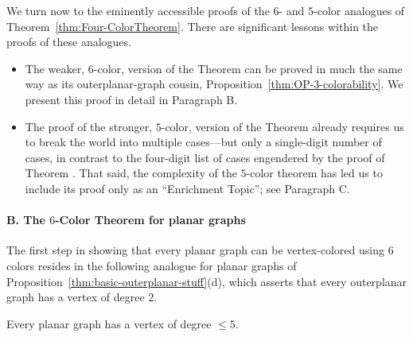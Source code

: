\bigskip

We turn now to the eminently accessible proofs of the $6$- and $5$-color analogues of Theorem~\ref{thm:Four-ColorTheorem}.  There are significant lessons within the proofs of these 
analogues.
\begin{itemize}
\item
The weaker, $6$-color, version of the Theorem can be proved in much the same way as its
outerplanar-graph cousin, Proposition~\ref{thm:OP-3-colorability}.  We
present this proof in detail in Paragraph B.  
\item
The proof of the stronger, $5$-color, version of the Theorem already requires us to break the world into multiple cases---but only a single-digit number of cases, in contrast to the four-digit list of cases engendered by the proof of Theorem \cite{AppelH77a,AppelH77b}.  That said, the complexity of the $5$-color theorem has led us to include its proof only as an ``Enrichment Topic''; see Paragraph C.
\end{itemize}


\paragraph {B. The $6$-Color Theorem for planar graphs}

The first step in showing that every planar graph can be vertex-colored using $6$ colors resides in the following analogue for planar graphs of Proposition~\ref{thm:basic-outerplanar-stuff}(d), which asserts that every outerplanar graph has a vertex of degree $2$.

\begin{lemma}
\label{thm:PlanarGraph-degree5}
Every planar graph has a vertex of degree $\leq 5$.
\end{lemma}

  

